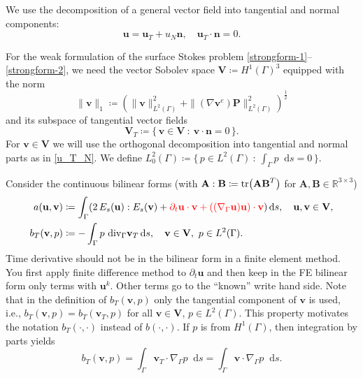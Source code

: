 \documentclass{article}
\newcommand{\vect}[1]{\boldsymbol{\mathbf{#1}}}
\newcommand{\bP}{\mathbf P}
\newcommand{\bV}{\mathbf V}
\newcommand{\bn}{\mathbf n}
\newcommand{\bu}{\mathbf u}
\newcommand{\bv}{\mathbf v}
\newcommand{\divG}{{\mathop{\,\rm div}}_{\Gamma}}
\newcommand{\gradG}{\nabla_{\Gamma}}
\newcommand*\diff{\mathop{}\!\mathrm{d}}
\begin{document}
We use the  decomposition of a general vector field into tangential and normal components:
\begin{equation}\label{u_T_N}
\bu = \bu_T + u_N\bn,\quad \bu_T\cdot\bn=0.
\end{equation}

For the weak formulation of the surface Stokes problem \eqref{strongform-1}--\eqref{strongform-2},
we need the vector Sobolev space $\bV\coloneqq  H^1(\Gamma)^3$ equipped with the norm
\begin{equation} \label{H1norm}
	\|\bv\|_{1}\coloneqq \left(\|\bv\|^2_{L^2(\Gamma)} + \|(\nabla\bv^e)\bP\|^2_{L^2(\Gamma)}\right)^{\frac12}
\end{equation}
and its subspace of tangential vector fields
\begin{equation}   \label{defVT}
 \bV_T\coloneqq  \{\, \bv \in \bV\::\: \bv\cdot \bn =0\,\}.
\end{equation}
For $\bv \in \bV$ we will use the orthogonal decomposition into tangential and normal parts
as in \eqref{u_T_N}.
We define $L_0^2(\Gamma)\coloneqq \{\,p \in L^2(\Gamma)\::\:\int_\Gamma p \diff{s} = 0\,\}$.

Consider the continuous bilinear forms (with $\vect A : \vect B \coloneqq {\rm tr}\big(\vect A \vect B^T\big)$ for  $\vect A, \vect B\in\mathbb{R}^{3\times3}$)
\begin{align}
a(\bu,\bv) &\coloneqq \int_\Gamma (2\,E_s(\bu):E_s(\bv)+{\color{red}\partial_t\mathbf{u}\cdot \bv+ ((\nabla_\Gamma \mathbf{u})\mathbf{u})\cdot \bv}) \diff{s}, \quad \bu,\bv \in \bV, \label{defblfa} \\
b_T(\bv,p) &\coloneqq -\int_\Gamma p\,\divG \bv_T \diff{s},  \quad \bv \in \bV, ~p \in L^2(\Gamma). \label{defblfb}
\end{align}
{\color{blue}
Time derivative should not be in the bilinear form in a finite element method. You first apply finite difference method to $\partial_t\mathbf{u}$ and then keep in the FE bilinear form only terms with $\mathbf{u}^k$. Other terms go to the ``known'' write hand side.
}
Note that in the definition of $b_T(\bv,p)$ only the {tangential} component of $\bv$ is used, i.e., $b_T(\bv,p)=b_T(\bv_T,p)$ for all $\bv \in \bV$, $p\in L^2(\Gamma)$. This property motivates the notation $b_T(\cdot,\cdot)$ instead of $b(\cdot,\cdot)$.
If $p$ is from $H^1(\Gamma)$, then integration by parts yields
\begin{equation}\label{Bform}
b_T(\bv,p)=\int_\Gamma  \bv_T\cdot \gradG p \diff{s} = \int_\Gamma  \bv \cdot \gradG p \diff{s}.
\end{equation}
\end{document}
